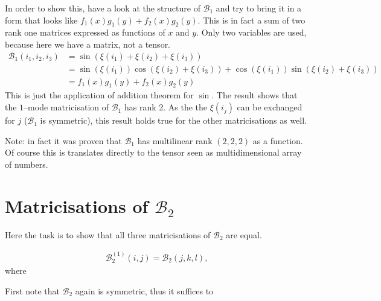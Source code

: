\documentclass[%
a4paper,
parskip=half,
DIV=calc,
]
{scrartcl}
\begin{document}
In order to show this, have a look at the structure of $\mathcal{B}_1$
and try to bring it in a form that looks like
$f_1(x)g_1(y) + f_2(x)g_2(y)$.  This is in fact a sum of two rank one
matrices expressed as functions of $x$ and $y$.  Only two variables
are used, because here we have a matrix, not a tensor.
\begin{align*}
  \mathcal{B}_1 \left(i_1, i_2, i_3 \right) &= \sin\left(\xi(i_1) + \xi(i_2) + \xi(i_3)\right) \\
                                           &= \sin\left(\xi(i_1)\right)\cos\left(\xi(i_2) + \xi(i_3)\right) +
                                               \cos\left(\xi(i_1)\right)\sin\left(\xi(i_2) + \xi(i_3)\right)\\
  &= f_1(x)g_1(y) + f_2(x)g_2(y)
\end{align*}
This is just the application of addition theorem for $\sin$.  The
result shows that the $1$--mode matricisation of $\mathcal{B}_1$ has
rank 2.  As the the $\xi(i_j)$ can be exchanged for $j$ ($\mathcal{B}_1$ is
symmetric), this result holds true for the other matricisations as
well.

Note: in fact it was proven that $\mathcal{B}_1$ has multilinear rank
$(2,2,2)$ as a function. Of course this is translates directly to the
tensor seen as multidimensional array of numbers.

\section{Matricisations of $\mathcal{B}_2$}
\label{sec:matb2}
Here the task is to show that all three matricisations of
$\mathcal{B}_2$ are equal.

\begin{align*}
  \mathcal{B}_2^{(1)}(i, j) = \mathcal{B}_2 (j, k, l),
\end{align*}
where 

First note that $\mathcal{B}_2$ again is
symmetric, thus it suffices to 
\end{document}
